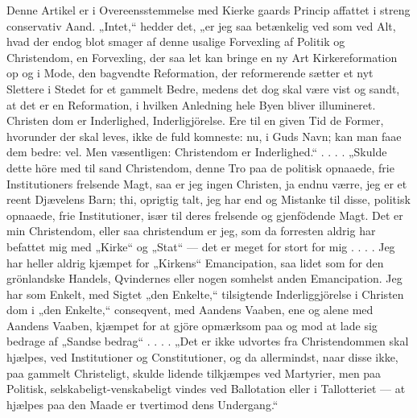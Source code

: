 \documentclass[12pt,a4paper]{article}
\newcommand{\opage}[1]{\marginnote{\footnotesize\textit{[#1]}}}
\begin{document}
Denne Artikel er i Overeensstemmelse med Kierke\-%
gaards Princip affattet i streng conservativ Aand. „Intet,“
hedder det, „er jeg saa betænkelig ved som ved Alt,
hvad der endog blot smager af denne usalige Forvexling
af Politik og Christendom, en Forvexling, der saa let
kan bringe en ny Art Kirkereformation op og i Mode,
den bagvendte Reformation, der reformerende sætter et
nyt Slettere i Stedet for et gammelt Bedre, medens det
dog skal være vist og sandt, at det er en Reformation,
i hvilken Anledning hele Byen bliver illumineret. Christen\-%
dom er Inderlighed, Inderligjörelse. Ere til en given
Tid de Former, hvorunder der skal leves, ikke de fuld\-%
komneste: nu, i Guds Navn; kan man faae dem bedre:
\opage{22} %
vel. Men væsentligen: Christendom er Inderlighed.“ . . . .
„Skulde dette höre med til sand Christendom, denne Tro
paa de politisk opnaaede, frie Institutioners frelsende
Magt, saa er jeg ingen Christen, ja endnu værre, jeg er
et reent Djævelens Barn; thi, oprigtig talt, jeg har end\-%
og Mistanke til disse, politisk opnaaede, frie Institutioner,
især til deres frelsende og gjenfödende Magt. Det er
min Christendom, eller saa christendum er jeg, som da
forresten aldrig har befattet mig med „Kirke“ og „Stat“
--- det er meget for stort for mig . . . . Jeg har heller
aldrig kjæmpet for „Kirkens“ Emancipation, saa lidet som
for den grönlandske Handels, Qvindernes eller nogen\-%
somhelst anden Emancipation. Jeg har som Enkelt, med
Sigtet „den Enkelte,“ tilsigtende Inderliggjörelse i Christen\-%
dom i „den Enkelte,“ conseqvent, med Aandens Vaaben,
ene og alene med Aandens Vaaben, kjæmpet for at gjöre
opmærksom paa og mod at lade sig bedrage af „Sandse\-%
bedrag“ . . . . „Det er ikke udvortes fra Christendommen
skal hjælpes, ved Institutioner og Constitutioner, og da
allermindst, naar disse ikke, paa gammelt Christeligt,
skulde lidende tilkjæmpes ved Martyrier, men paa Politisk,
selskabeligt-venskabeligt vindes ved Ballotation eller i
Tallotteriet --- at hjælpes paa den Maade er tvertimod
dens Undergang.“
\end{document}

